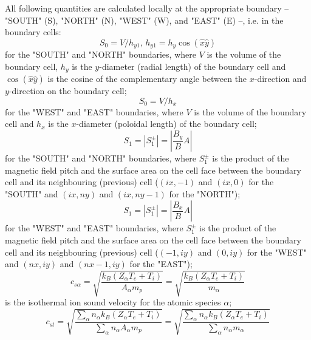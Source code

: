 \documentclass[a4paper,10pt]{report}
\begin{document}
All following quantities are calculated locally at the appropriate boundary
-- "SOUTH" (S), "NORTH" (N), "WEST" (W), and "EAST" (E) --, i.e. in the boundary cells:
\begin{equation}
S_{0}=V/h_{y1}\text{, \ \ \ }h_{y1}=h_{y}\cos(\widehat{x}\widehat{y})
\label{5}
\end{equation}
for the "SOUTH" and "NORTH" boundaries, where $V$ is the volume of the boundary
cell, $h_{y}$ is the $y$-diameter (radial length) of the boundary cell and
$\cos(\widehat{x}\widehat{y})$ is the cosine of the complementary angle
between the $x$-direction and $y$-direction on the boundary cell;
\begin{equation}
S_{0}=V/h_{x}   \label{6}
\end{equation}
for the "WEST" and "EAST" boundaries, where $V$ is the volume of the boundary cell
and $h_{x}$ is the $x$-diameter (poloidal length) of the boundary cell;
\begin{equation}
S_{1}=\left| S_{1}^{\pm}\right| =\left| \frac{B_{y}}{B}A\right|   \label{7}
\end{equation}
for the "SOUTH" and "NORTH" boundaries, where $S_{1}^{\pm}$ is the product of the
magnetic field pitch and the surface area on the cell face between the
boundary cell and its neighbouring (previous) cell ($(ix,-1)$ and $(ix,0)$ for
the "SOUTH" and $(ix,ny)$ and $(ix,ny-1)$ for the "NORTH");
\begin{equation}
S_{1}=\left| S_{1}^{\pm}\right| =\left| \frac{B_{x}}{B}A\right|   \label{8}
\end{equation}
for the "WEST" and "EAST" boundaries, where $S_{1}^{\pm}$ is the product of the
magnetic field pitch and the surface area on the cell face between the
boundary cell and its neighbouring (previous) cell ($(-1,iy)$ and $(0,iy)$ for
the "WEST" and $(nx,iy)$ and $(nx-1,iy)$ for the "EAST");
\begin{equation}
c_{s\alpha}=\sqrt{\frac{k_{B}\left( Z_{\alpha}T_{e}+T_{i}\right) }
{A_{\alpha}m_{p}}}=\sqrt{\frac{k_{B}\left( Z_{\alpha}T_{e}+T_{i}\right) }
{m_{\alpha}}}   \label{9}
\end{equation}
is the isothermal ion sound velocity for the atomic species $\alpha$;
\begin{equation}
c_{st}=\sqrt{\frac{\sum_{\alpha}n_{\alpha}k_{B}\left(
Z_{\alpha}T_{e}+T_{i}\right) }{\sum_{\alpha}n_{\alpha}A_{\alpha}m_{p}}}=
\sqrt{\frac {\sum_{\alpha}n_{\alpha}k_{B}\left( Z_{\alpha}T_{e}+T_{i}\right)
}{\sum_{\alpha}n_{\alpha}m_{\alpha}}}   \label{10}
\end{equation}
\end{document}
